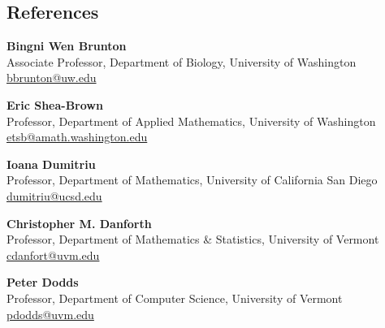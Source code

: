 \documentclass[margin,line]{res}
\begin{document}
\begin{resume}
  \section{\sc References}
  {\bf Bingni Wen Brunton}\\
  Associate Professor,
  Department of Biology,
  University of Washington\\
  \href{mailto:bbrunton@uw.edu}{bbrunton@uw.edu}
  
  {\bf Eric Shea-Brown}\\
  Professor,
  Department of Applied Mathematics,
  University of Washington\\
  \href{mailto:etsb@amath.washington.edu}{etsb@amath.washington.edu}
  
  {\bf Ioana Dumitriu}\\
  Professor,
  Department of Mathematics,
  University of California San Diego\\
  \href{mailto:dumitriu@ucsd.edu}{dumitriu@ucsd.edu}

  {\bf Christopher M. Danforth}\\
  Professor, 
  Department of Mathematics \& Statistics,
  University of Vermont\\
  \href{mailto:cdanfort@uvm.edu}{cdanfort@uvm.edu}

  {\bf Peter Dodds}\\
  Professor,
  Department of Computer Science,
  University of Vermont\\
  \href{mailto:pdodds@uvm.edu}{pdodds@uvm.edu}



  



  

\end{resume}
\end{document}
